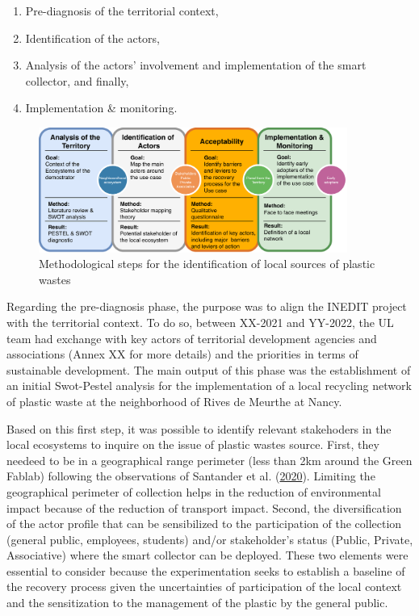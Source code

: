 \documentclass[
  11pt,
]{article}
\providecommand{\tightlist}{%
  \setlength{\itemsep}{0pt}\setlength{\parskip}{0pt}}\usepackage{longtable,booktabs,array}
\begin{document}
\begin{enumerate}
\def\labelenumi{\arabic{enumi}.}
\tightlist
\item
  Pre-diagnosis of the territorial context,
\item
  Identification of the actors,
\item
  Analysis of the actors' involvement and implementation of the smart
  collector, and finally,
\item
  Implementation \& monitoring.
\end{enumerate}

\begin{figure}[H]

{\centering \includegraphics[width=0.9\textwidth,height=\textheight]{figures/Fedoua-00.pdf}

}

\caption{\label{fig-fedoua-00}Methodological steps for the
identification of local sources of plastic wastes}

\end{figure}

Regarding the pre-diagnosis phase, the purpose was to align the INEDIT
project with the territorial context. To do so, between XX-2021 and
YY-2022, the UL team had exchange with key actors of territorial
development agencies and associations (Annex XX for more details) and
the priorities in terms of sustainable development. The main output of
this phase was the establishment of an initial Swot-Pestel analysis for
the implementation of a local recycling network of plastic waste at the
neighborhood of Rives de Meurthe at Nancy.

Based on this first step, it was possible to identify relevant
stakehoders in the local ecosystems to inquire on the issue of plastic
wastes source. First, they needeed to be in a geographical range
perimeter (less than 2km around the Green Fablab) following the
observations of Santander et al.
(\protect\hyperlink{ref-Santander2020}{2020}). Limiting the geographical
perimeter of collection helps in the reduction of environmental impact
because of the reduction of transport impact. Second, the
diversification of the actor profile that can be sensibilized to the
participation of the collection (general public, employees, students)
and/or stakeholder's status (Public, Private, Associative) where the
smart collector can be deployed. These two elements were essential to
consider because the experimentation seeks to establish a baseline of
the recovery process given the uncertainties of participation of the
local context and the sensitization to the management of the plastic by
the general public.
\end{document}
